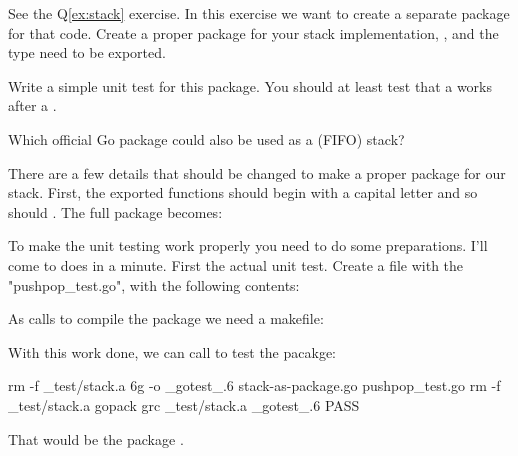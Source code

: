 \begin{Exercise}[title={Stack as package},difficulty=2]
\label{ex:stack-package}
\Question\label{ex:stack-package q1} 
See the Q\ref{ex:stack} exercise. In this exercise we want to create
a separate package for that code.
Create a proper package for your
stack implementation, ,  and the  type need to be
exported.

\Question\label{ex:stack-package q2} Write a simple unit test for this package.
You should at least test that a  works after a .

\Question\label{ex:stack-package q3} Which official Go package could
also be used as a (FIFO) stack?
\end{Exercise}

\begin{Answer}
\Question There are a few details that should be changed to make a proper package
for our stack. First, the exported functions should begin with a capital 
letter and so should . The full package becomes:


\Question To make the unit testing work properly you need to do some
preparations. I'll come to does in a minute. First the actual unit test.
Create a file with the "pushpop\_test.go", with the following contents:

As  calls  to compile the package we need a makefile:

With this work done, we can call  to test the pacakge:

\begin{display}
\pr {}
rm -f _test/stack.a
6g  -o _gotest_.6 stack-as-package.go  pushpop_test.go
rm -f _test/stack.a
gopack grc _test/stack.a _gotest_.6 
PASS
\end{display}

\Question That would be the package .
\end{Answer}

